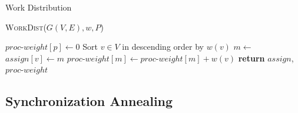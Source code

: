 \begin{algorithm}
\caption{Work Distribution}\label{alg:work_dist}
\textsc{WorkDist}($G(V,E), w, P$)
\begin{algorithmic}[1]
	\State $proc$-$weight[p] \gets 0$  %
\EndFor
\State Sort $v \in V$ in descending order by $w(v)$
        \State $m \gets $ 
	\State $assign[v] \gets m$ %
	\State $proc$-$weight[m] \gets proc$-$weight[m] + w(v)$ %
\EndFor
\State \textbf{return} $assign$, $proc$-$weight$ 
\end{algorithmic}
\end{algorithm}



\subsection{Synchronization Annealing}